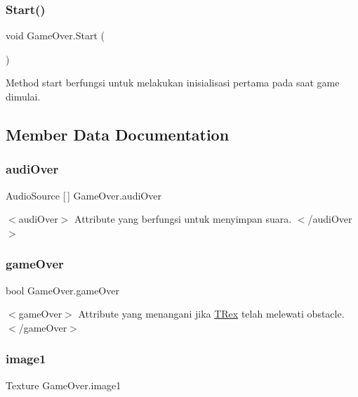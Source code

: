 \subsubsection{\texorpdfstring{Start()}{Start()}}
{\footnotesize\ttfamily void Game\+Over.\+Start (\begin{DoxyParamCaption}{ }\end{DoxyParamCaption})\hspace{0.3cm}{\ttfamily [private]}}



Method start berfungsi untuk melakukan inisialisasi pertama pada saat game dimulai. 



\subsection{Member Data Documentation}
\hypertarget{class_game_over_a7fc748e99982365f5d3aa91ee48fcaae}{}\label{class_game_over_a7fc748e99982365f5d3aa91ee48fcaae} 
\subsubsection{\texorpdfstring{audi\+Over}{audiOver}}
{\footnotesize\ttfamily Audio\+Source \mbox{[}$\,$\mbox{]} Game\+Over.\+audi\+Over}

$<$audi\+Over$>$ Attribute yang berfungsi untuk menyimpan suara. $<$/audi\+Over$>$ \hypertarget{class_game_over_a017e52022fa05909ffff9f41cf66556f}{}\label{class_game_over_a017e52022fa05909ffff9f41cf66556f} 
\subsubsection{\texorpdfstring{game\+Over}{gameOver}}
{\footnotesize\ttfamily bool Game\+Over.\+game\+Over}

$<$game\+Over$>$ Attribute yang menangani jika \hyperlink{class_t_rex}{T\+Rex} telah melewati obstacle. $<$/game\+Over$>$ \hypertarget{class_game_over_a3d0b130d2f0adc32fad8c776512c4d81}{}\label{class_game_over_a3d0b130d2f0adc32fad8c776512c4d81} 
\subsubsection{\texorpdfstring{image1}{image1}}
{\footnotesize\ttfamily Texture Game\+Over.\+image1}

